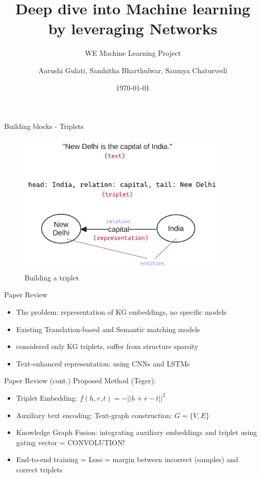 \documentclass{beamer}
\title{Deep dive into Machine learning by leveraging Networks}
\subtitle{WE Machine Learning Project}
\author{Aarushi Gulati, Samhitha Bharthulwar, Saumya Chaturvedi}
\institute{WE Program Cohort 4}
\date{\today}
\begin{document}
\begin{frame}
\titlepage
\end{frame}

\begin{frame}{Building blocks - Triplets}
    \begin{figure}
        \includegraphics[width=0.9\textwidth]{attachments/triplets.png}
        \caption{Building a triplet}
        \label{fig:triplet}
\end{figure}
\end{frame}

\begin{frame}{Paper Review \cite{paper}}
    \begin{itemize}
        \item The problem: representation of KG embeddings, no specific models
        \item Existing Translation-based and Semantic matching models
        \item considered only KG triplets, suffer from structure sparsity
        \item Text-enhanced representation: using CNNs and LSTMs
    \end{itemize}
\end{frame}

\begin{frame}{Paper Review \cite{paper} (cont.)}
    Proposed Method (Teger):
    \begin{itemize}
        \item Triplet Embedding: $f (h, r, t) = -||h + r - t||^2$
        \item Auxiliary text encoding: Text-graph construction: $G = \{V, E\}$
        \item Knowledge Graph Fusion: integrating auxiliary embeddings and triplet using gating vector  = CONVOLUTION!
        \item End-to-end training = Loss = margin between incorrect (samples) and correct triplets
    \end{itemize}
\end{frame}
\end{document}
